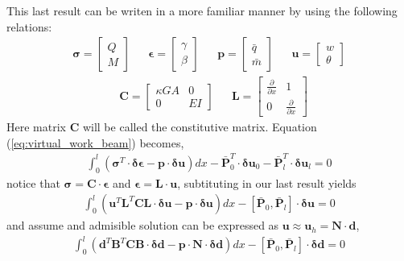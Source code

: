 \documentclass[10pt,twoside,a4paper]{article}
\renewcommand{\vec}[1]{\mathbf{#1}}
\begin{document}
This last result can be writen in a more familiar manner by using the following relations:
\begin{align*}
	&\vec{\sigma} =
	\begin{bmatrix}
	Q \\
	M
	\end{bmatrix}&
	&\vec{\epsilon} =
	\begin{bmatrix}
	\gamma \\
	\beta
	\end{bmatrix}&
	&\vec{p} =
	\begin{bmatrix}
	\bar{q} \\
	\bar{m}
	\end{bmatrix}&
	&\vec{u} =
	\begin{bmatrix}
	w \\
	\theta
	\end{bmatrix}& 
\end{align*}
\begin{align*}
	&\vec{C} =
	\begin{bmatrix}
	\kappa G A	& 0 \\
	0				& EI
	\end{bmatrix}& 
	&\vec{L} = 
	\begin{bmatrix}
	\frac{\partial }{\partial x}	& 1\\
	0	& \frac{\partial }{\partial x}
	\end{bmatrix}
\end{align*}
Here matrix $\vec{C}$ will be called the constitutive matrix. Equation (\ref{eq:virtual_work_beam}) becomes,
\begin{align} 
	\int_0^l ( \vec{\sigma}^T \cdot \vec{\delta \epsilon} - \vec{p} \cdot \vec{\delta u} ) dx 
	- \bar{\vec{P}}_0^T \cdot \vec{\delta u}_0 - \bar{\vec{P}}_l^T \cdot \vec{\delta u}_l = 0
\end{align}
notice that $\vec{\sigma} = \vec{C} \cdot \vec{\epsilon}$ and $\vec{\epsilon} = \vec{L} \cdot \vec{u}$, subtituting in our last result yields
\begin{align}
	\int_0^l (\vec{u}^T \vec{L}^T \vec{C} \vec{L} \cdot \vec{\delta u} 
	- \vec{p} \cdot \vec{\delta u})dx 
	- [\bar{\vec{P}}_0 , \bar{\vec{P}}_l] \cdot \vec{\delta u} = 0
\end{align}
and assume and admisible solution can be expressed as $\vec{u} \approx \vec{u}_h = \vec{N} \cdot \vec{d}$,
\begin{align}
	\int_0^l (\vec{d}^T \vec{B}^T \vec{C} \vec{B} \cdot \vec{\delta d} 
	- \vec{p} \cdot \vec{N} \cdot \vec{\delta d})dx 
	- [\bar{\vec{P}}_0 , \bar{\vec{P}}_l] \cdot \vec{\delta d} = 0
\end{align}
\end{document}
